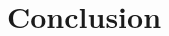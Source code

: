 \documentclass[a4paper,12pt,oneside]{article}
\begin{document}







\section{Conclusion}






\begin{thebibliography}{99}
\end{thebibliography}
\end{document}
